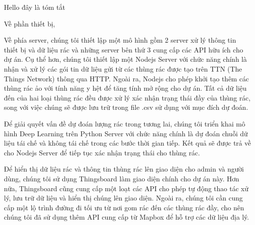 
Hello đây là tóm tắt

Về phần thiết bị,

Về phía server, chúng tôi thiết lập một mô hình gồm 2 server xử lý thông tin thiết bị và dữ liệu rác và những server bên thứ 3 cung cấp các API hữu ích cho dự án. Cụ thể hơn, chúng tôi thiết lập một Nodejs Server với chức năng chính là nhận và xử lý các gói tin dữ liệu gửi từ các thùng rác được tạo trên TTN (The Things Network) thông qua HTTP. Ngoài ra, Nodejs cho phép khởi tạo thêm các thùng rác ảo với tính năng y hệt để tăng tính mở rộng cho dự án. Tất cả dữ liệu đến của hai loại thùng rác đều được xử lý xác nhận trạng thái đầy của thùng rác, song với việc chúng sẽ được lưu trữ trong file .csv sử dụng với mục đích dự đoán.

Để giải quyết vấn đề dự đoán lượng rác trong tương lai, chúng tôi triển khai mô hình Deep Learning trên Python Server với chức năng chính là dự đoán chuỗi dữ liệu tái chế và không tái chế trong các bước thời gian tiếp. Kết quả sẽ được trả về cho Nodejs Server để tiếp tục xác nhận trạng thái cho thùng rác.

Để hiển thị dữ liệu rác và thông tin thùng rác lên giao diện cho admin và người dùng, chúng tôi sử dụng Thingsboard làm giao diện chính cho dự án này. Hơn nữa, Thingsboard cũng cung cấp một loạt các API cho phép tự động thao tác xử lý, lưu trữ dữ liệu và hiển thị chúng lên giao diện. Ngoài ra, chúng tôi cần cung cấp một lộ trình đường đi tối ưu từ nơi gom rác đến các thùng rác đầy, cho nên chúng tôi đã sử dụng thêm API cung cấp từ Mapbox để hỗ trợ các dữ liệu địa lý.